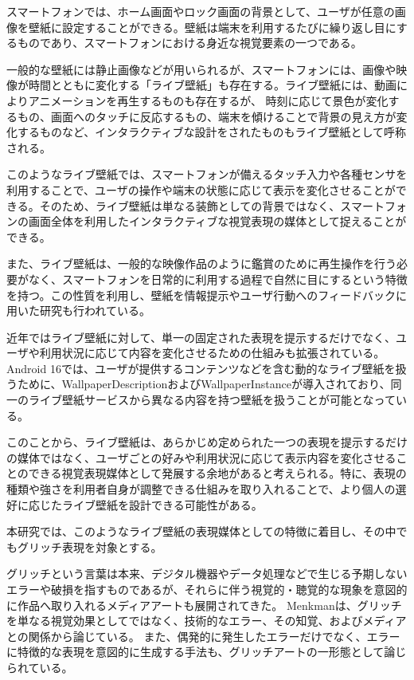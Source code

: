 スマートフォンでは、ホーム画面やロック画面の背景として、ユーザが任意の画像を壁紙に設定することができる。壁紙は端末を利用するたびに繰り返し目にするものであり、スマートフォンにおける身近な視覚要素の一つである。

一般的な壁紙には静止画像などが用いられるが、スマートフォンには、画像や映像が時間とともに変化する「ライブ壁紙」も存在する。ライブ壁紙には、動画によりアニメーションを再生するものも存在するが、
時刻に応じて景色が変化するもの、画面へのタッチに反応するもの、端末を傾けることで背景の見え方が変化するものなど、インタラクティブな設計をされたものもライブ壁紙として呼称される。

このようなライブ壁紙では、スマートフォンが備えるタッチ入力や各種センサを利用することで、ユーザの操作や端末の状態に応じて表示を変化させることができる。そのため、ライブ壁紙は単なる装飾としての背景ではなく、スマートフォンの画面全体を利用したインタラクティブな視覚表現の媒体として捉えることができる。

また、ライブ壁紙は、一般的な映像作品のように鑑賞のために再生操作を行う必要がなく、スマートフォンを日常的に利用する過程で自然に目にするという特徴を持つ。この性質を利用し、壁紙を情報提示やユーザ行動へのフィードバックに用いた研究も行われている\cite{dearman2012wallpaper,murray2013avatar,nwagu2023chai}。

近年ではライブ壁紙に対して、単一の固定された表現を提示するだけでなく、ユーザや利用状況に応じて内容を変化させるための仕組みも拡張されている。Android 16では、ユーザが提供するコンテンツなどを含む動的なライブ壁紙を扱うために、WallpaperDescriptionおよびWallpaperInstanceが導入されており、同一のライブ壁紙サービスから異なる内容を持つ壁紙を扱うことが可能となっている\cite{android16_wallpaper}。

このことから、ライブ壁紙は、あらかじめ定められた一つの表現を提示するだけの媒体ではなく、ユーザごとの好みや利用状況に応じて表示内容を変化させることのできる視覚表現媒体として発展する余地があると考えられる。特に、表現の種類や強さを利用者自身が調整できる仕組みを取り入れることで、より個人の選好に応じたライブ壁紙を設計できる可能性がある。

本研究では、このようなライブ壁紙の表現媒体としての特徴に着目し、その中でもグリッチ表現を対象とする。


グリッチという言葉は本来、デジタル機器やデータ処理などで生じる予期しないエラーや破損を指すものであるが、それらに伴う視覚的・聴覚的な現象を意図的に作品へ取り入れるメディアアートも展開されてきた。
Menkmanは、グリッチを単なる視覚効果としてではなく、技術的なエラー、その知覚、およびメディアとの関係から論じている\cite{menkman2011momentum}。
また、偶発的に発生したエラーだけでなく、エラーに特徴的な表現を意図的に生成する手法も、グリッチアートの一形態として論じられている。

